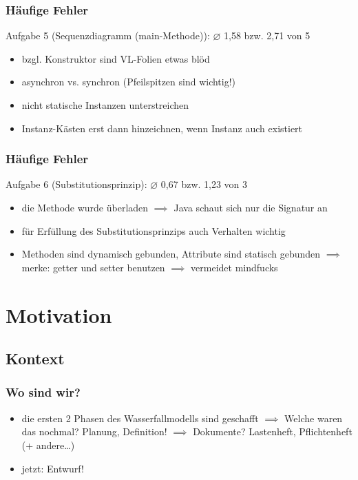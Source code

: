 \documentclass[18pt]{beamer}
\begin{document}
	\begin{frame}
		\frametitle{Häufige Fehler}
		\begin{block}{Aufgabe 5 (Sequenzdiagramm (main-Methode)): $\diameter$ 1,58 bzw. 2,71 von 5}
			\begin{itemize}
				\pause 
				\item bzgl. Konstruktor sind VL-Folien etwas blöd \pause
				\item asynchron vs. synchron (Pfeilspitzen sind wichtig!) \pause
				\item nicht statische Instanzen unterstreichen \pause
				\item Instanz-Kästen erst dann hinzeichnen, wenn Instanz auch existiert
			\end{itemize}
		\end{block}
	\end{frame}

	\begin{frame}
		\frametitle{Häufige Fehler}
		\begin{block}{Aufgabe 6 (Substitutionsprinzip): $\diameter$ 0,67 bzw. 1,23 von 3}
			\begin{itemize}
				\pause
				\item die Methode wurde überladen 
				\linebreak $\implies$ Java schaut sich nur die Signatur an \pause
				\item für Erfüllung des Substitutionsprinzips auch Verhalten wichtig \pause
				\item Methoden sind dynamisch gebunden, Attribute sind statisch gebunden
				\linebreak $\implies$ merke: getter und setter benutzen
				\linebreak $\implies$ vermeidet mindfucks
			\end{itemize}
		\end{block}
	\end{frame}



\section{Motivation}
	\subsection{Kontext}
		\begin{frame}
			\frametitle{Wo sind wir?}
			\begin{itemize}
				\item die ersten 2 Phasen des Wasserfallmodells sind geschafft
				\pause
				\linebreak $\implies$ Welche waren das nochmal? \pause Planung, Definition!
				\pause
				\linebreak $\implies$ Dokumente? \pause Lastenheft, Pflichtenheft (+ andere\dots)
				\pause
				\item  jetzt: Entwurf!
			\end{itemize}
		\end{frame}
	
\end{document}

